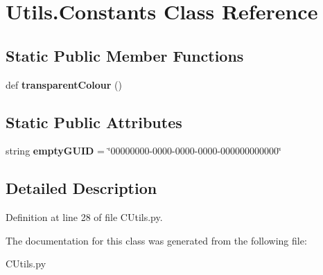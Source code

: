\hypertarget{class_c_utils_1_1_utils_1_1_constants}{}\section{Utils.\+Constants Class Reference}
\label{class_c_utils_1_1_utils_1_1_constants}
\subsection*{Static Public Member Functions}
\begin{DoxyCompactItemize}
\item 
\mbox{\label{class_c_utils_1_1_utils_1_1_constants_a957b3083d5f5b6db27830f9429d2d10b}} 
def {\bfseries transparent\+Colour} ()
\end{DoxyCompactItemize}
\subsection*{Static Public Attributes}
\begin{DoxyCompactItemize}
\item 
\mbox{\label{class_c_utils_1_1_utils_1_1_constants_a7c1ce2f7c84c7eb29d7a0b7660a419b2}} 
string {\bfseries empty\+G\+U\+ID} = \char`\"{}00000000-\/0000-\/0000-\/0000-\/000000000000\char`\"{}
\end{DoxyCompactItemize}


\subsection{Detailed Description}


Definition at line 28 of file C\+Utils.\+py.



The documentation for this class was generated from the following file\+:\begin{DoxyCompactItemize}
\item 
C\+Utils.\+py\end{DoxyCompactItemize}
